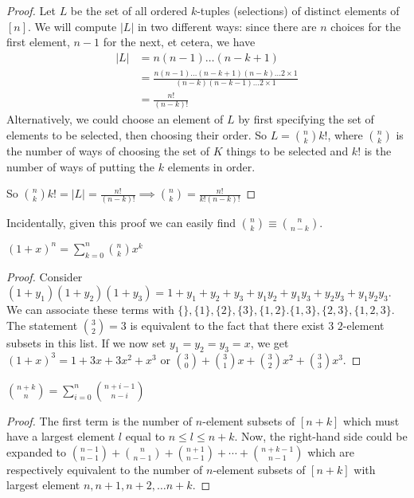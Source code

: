 \documentclass[12pt]{article}
\begin{document}
\begin{proof}
Let $L$ be the set of all ordered $k$-tuples (selections) of distinct elements of $[n]$. We will compute $|L|$ in two different ways: since there are $n$ choices for the first element, $n-1$ for the next, et cetera, we have
\begin{align*}
|L| &= n(n-1)\dots(n-k+1)\\
&= \frac{n(n-1)\dots(n-k+1)(n-k)\dots2 \times 1}{(n-k)(n-k-1)\dots2 \times 1}\\
&= \frac{n!}{(n-k)!}
\end{align*}
Alternatively, we could choose an element of $L$ by first specifying the set of elements to be selected, then choosing their order. So $L = {n \choose k} k!$, where ${n \choose k}$ is the number of ways of choosing the set of $K$ things to be selected and $k!$ is the number of ways of putting the $k$ elements in order.

So ${n \choose k} k! = |L| = \frac{n!}{(n-k)!} \implies {n \choose k} = \frac{n!}{k!(n-k)!}$
\end{proof}

Incidentally, given this proof we can easily find ${n \choose k} \equiv {n \choose n-k}$.

\begin{theorem}
${(1 + x)}^n = \sum_{k=0}^n {n \choose k} x^k$
\end{theorem}

\begin{proof}
Consider $(1 + y_1)(1 + y_2)(1 + y_3) = 1 + y_1 + y_2 + y_3 + y_1y_2 + y_1y_3 + y_2y_3 + y_1y_2y_3$. We can associate these terms with $\{\}, \{1\}, \{2\}, \{3\}, \{1,2\}. \{1,3\}, \{2,3\}, \{1,2,3\}$. The statement ${3 \choose 2} = 3$ is equivalent to the fact that there exist $3$ $2$-element subsets in this list. If we now set $y_1 = y_2 = y_3 = x$, we get ${(1 + x)}^3 = 1 + 3x + 3x^2 + x^3$ or ${3 \choose 0} + {3 \choose 1}x + {3 \choose 2}x^2 + {3 \choose 3}x^3$.
\end{proof}

\begin{lemma}
$\displaystyle{n + k \choose n} = \sum_{i=0}^n {n + i - 1 \choose n - i}$
\end{lemma}

\begin{proof}
The first term is the number of $n$-element subsets of $[n+k]$ which must have a largest element $l$ equal to $n \leq l \leq n+k$. Now, the right-hand side could be expanded to ${n-1 \choose n-1} + {n \choose n-1} + {n+1 \choose n-1} + \cdots + {n + k -1 \choose n-1}$ which are respectively equivalent to the number of $n$-element subsets of $[n+k]$ with largest element $n, n+1, n+2, \dots n+k$.
\end{proof}
\end{document}
